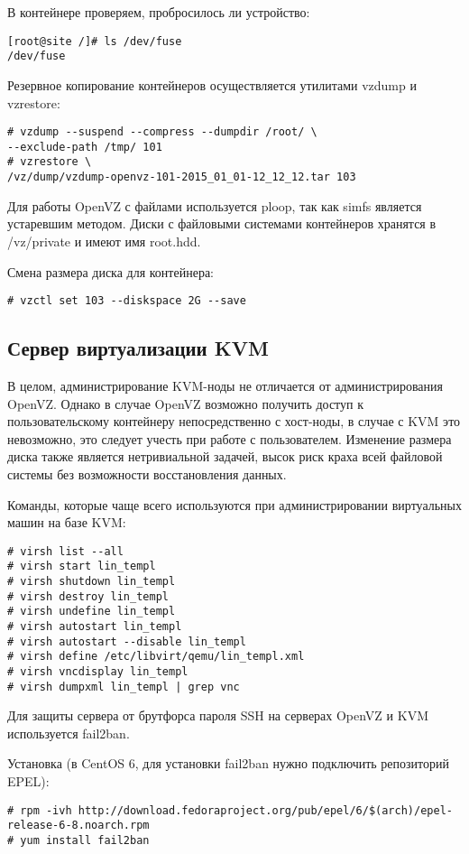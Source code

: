 В контейнере проверяем, пробросилось ли устройство:
\begin{lstlisting}
[root@site /]# ls /dev/fuse
/dev/fuse
\end{lstlisting}

Резервное копирование контейнеров осуществляется утилитами vzdump и vzrestore:
\begin{lstlisting}
# vzdump --suspend --compress --dumpdir /root/ \
--exclude-path /tmp/ 101
# vzrestore \
/vz/dump/vzdump-openvz-101-2015_01_01-12_12_12.tar 103
\end{lstlisting}

Для работы OpenVZ с файлами используется ploop, так как simfs является устаревшим методом.
Диски с файловыми системами контейнеров хранятся в /vz/private и имеют имя root.hdd.

Смена размера диска для контейнера:
\begin{lstlisting}
# vzctl set 103 --diskspace 2G --save
\end{lstlisting}

\subsection{Сервер виртуализации KVM}

В целом, администрирование KVM-ноды не отличается от администрирования OpenVZ.
Однако в случае OpenVZ возможно получить доступ к пользовательскому контейнеру непосредственно с хост-ноды, в случае с KVM это невозможно, это следует учесть при работе с пользователем.
Изменение размера диска также является нетривиальной задачей, высок риск краха всей файловой системы без возможности восстановления данных.

Команды, которые чаще всего используются при администрировании виртуальных машин на базе KVM:
\begin{lstlisting}
# virsh list --all
# virsh start lin_templ
# virsh shutdown lin_templ
# virsh destroy lin_templ
# virsh undefine lin_templ
# virsh autostart lin_templ
# virsh autostart --disable lin_templ
# virsh define /etc/libvirt/qemu/lin_templ.xml
# virsh vncdisplay lin_templ
# virsh dumpxml lin_templ | grep vnc
\end{lstlisting}

Для защиты сервера от брутфорса пароля SSH на серверах OpenVZ и KVM используется fail2ban.

Установка (в CentOS 6, для установки fail2ban нужно подключить репозиторий EPEL):
\begin{lstlisting}
# rpm -ivh http://download.fedoraproject.org/pub/epel/6/$(arch)/epel-release-6-8.noarch.rpm
# yum install fail2ban
\end{lstlisting}


